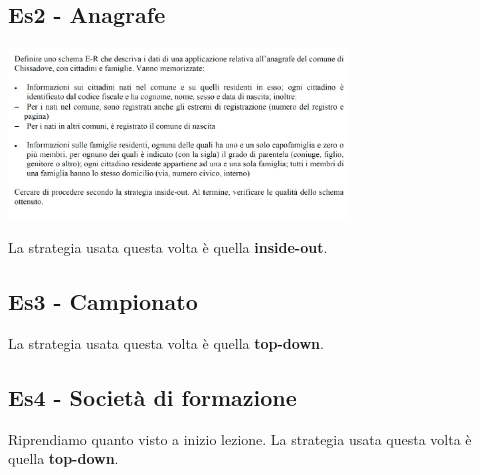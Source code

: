\subsection{Es2 - Anagrafe}
\begin{center}
    \includegraphics[width=0.675\textwidth]{chaptersLezioniSara/img/ER_es3anagrafe_specifiche1.jpg}
\end{center}
La strategia usata questa volta è quella \textbf{inside-out}.

\subsection{Es3 - Campionato}
La strategia usata questa volta è quella \textbf{top-down}.

\subsection{Es4 - Società di formazione}
Riprendiamo quanto visto a inizio lezione.
La strategia usata questa volta è quella \textbf{top-down}.